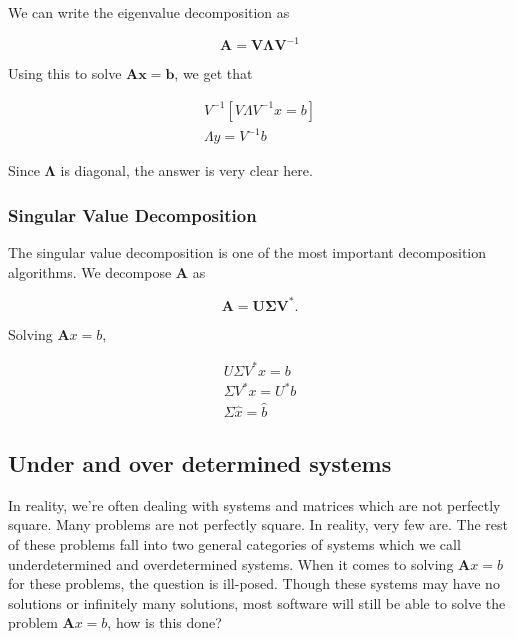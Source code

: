 \documentclass[12pt]{article}
\renewcommand{\vec}[1]{\mathbf{#1}}
\theoremstyle{definition}
\theoremstyle{remark}
\numberwithin{equation}{section}
\begin{document}
We can write the eigenvalue decomposition as 

\begin{equation}
  \vec{A} = \vec{V} \vec{\Lambda} \vec{V}^{-1}
\end{equation}

Using this to solve $\vec{Ax}=\vec{b}$, we get that

\begin{align}
  V^{-1} [ V \Lambda V^{-1} x = b]\\
  \Lambda y = V^{-1} b
 \end{align}

 Since $\vec{\Lambda}$ is diagonal, the answer is very clear here.

\subsubsection{Singular Value Decomposition}%
 \label{ssub:singular_value_decomposition}
 
The singular value decomposition is one of the most important decomposition algorithms. We decompose $\vec{A}$ as

\begin{equation}
  \vec{A} = \vec{U \Sigma V}^{*}. 
\end{equation}


Solving $\vec{A}x=b$,

\begin{align}
  U\Sigma V^{*} x = b \\
\Sigma V^* x = U^* b \\
\Sigma \hat{x} = \hat{b}
\end{align}


\subsection{Under and over determined systems}%
\label{sub:under_and_over_determined_systems}


In reality, we're often dealing with systems and matrices which are not perfectly square. Many problems are not perfectly square. In reality, very few are. The rest of these problems fall into two general categories of systems which we call underdetermined and overdetermined systems. When it comes to solving $\vec{A}x=b$ for these problems, the question is ill-posed. Though these systems may have no solutions or infinitely many solutions, most software will still be able to solve the problem $\vec{A}x=b$, how is this done?
\end{document}
